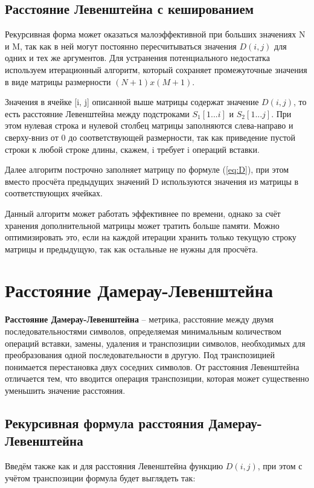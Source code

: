 \subsection{Расстояние Левенштейна с кешированием}
Рекурсивная форма может оказаться малоэффективной при больших значениях N и M, так как в ней могут постоянно пересчитываться значения $D(i, j)$ для одних и тех же аргументов. Для устранения потенциального недостатка используем итерационный алгоритм, который сохраняет промежуточные значения в виде матрицы размерности $(N+1)x(M+1)$.

Значения в ячейке [i, j] описанной выше матрицы содержат значение $D(i, j)$, то есть расстояние Левенштейна между подстроками $S_1[1...i]$ и $S_2[1...j]$.
При этом нулевая строка и нулевой столбец матрицы заполняются слева-направо и сверху-вниз от 0 до соответствующей размерности,  так как приведение пустой строки к любой строке длины, скажем, i требует i операций вставки.

Далее алгоритм построчно заполняет матрицу по формуле (\ref{eq:D}), при этом вместо просчёта предыдущих значений D используются значения из матрицы в соответствующих ячейках.

Данный алгоритм может работать эффективнее по времени, однако за счёт хранения дополнительной матрицы может тратить больше памяти. Можно оптимизировать это, если на каждой итерации хранить только текущую строку матрицы и предыдущую, так как остальные не нужны для просчёта.

\section{Расстояние Дамерау-Левенштейна}

\textbf{Расстояние Дамерау-Левенштейна} – метрика, расстояние между двумя последовательностями символов, определяемая минимальным количеством операций вставки, замены, удаления и транспозиции символов, необходимых для преобразования одной последовательности в другую. Под транспозицией понимается перестановка двух соседних символов. От расстояния Левенштейна отличается тем, что вводится операция транспозиции, которая может существенно уменьшить значение расстояния.

\subsection{Рекурсивная формула расстояния Дамерау-Левенштейна}

Введём также как и для расстояния Левенштейна функцию $D(i, j)$, при этом с учётом транспозиции формула будет выглядеть так:

